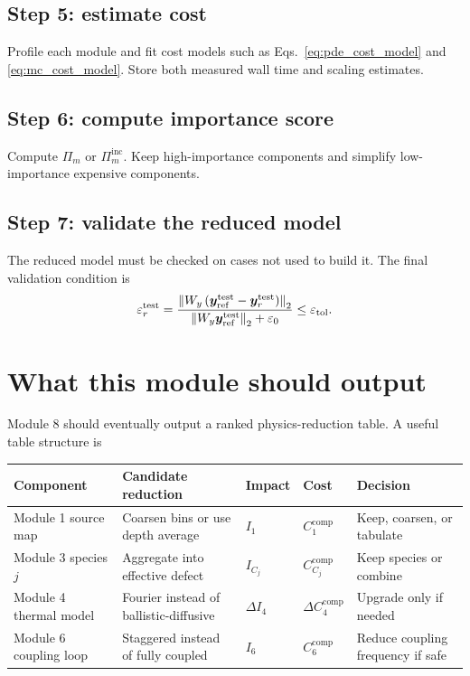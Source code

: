 \documentclass[11pt]{article}
\begin{document}
\subsection{Step 5: estimate cost}
Profile each module and fit cost models such as Eqs.~\eqref{eq:pde_cost_model} and \eqref{eq:mc_cost_model}. Store both measured wall time and scaling estimates.

\subsection{Step 6: compute importance score}
Compute \(\Pi_m\) or \(\Pi_m^{\mathrm{inc}}\). Keep high-importance components and simplify low-importance expensive components.

\subsection{Step 7: validate the reduced model}
The reduced model must be checked on cases not used to build it. The final validation condition is
\begin{equation}
    \varepsilon_r^{\mathrm{test}}
    =
    \frac{\norm{W_y\left(\bm{y}_{\mathrm{ref}}^{\mathrm{test}}-\bm{y}_{r}^{\mathrm{test}}\right)}_2}
    {\norm{W_y\bm{y}_{\mathrm{ref}}^{\mathrm{test}}}_2+\varepsilon_0}
    \leq
    \varepsilon_{\mathrm{tol}}.
    \label{eq:test_error_condition}
\end{equation}

\section{What this module should output}
Module 8 should eventually output a ranked physics-reduction table. A useful table structure is
\begin{center}
\begin{tabularx}{0.96\textwidth}{>{\RaggedRight\arraybackslash}p{}>{\RaggedRight\arraybackslash}p{}>{\RaggedRight\arraybackslash}p{}>{\RaggedRight\arraybackslash}p{}>{\RaggedRight\arraybackslash}X}
\toprule
Component & Candidate reduction & Impact & Cost & Decision \\
\midrule
Module 1 source map & Coarsen bins or use depth average & \(I_1\) & \(C_1^{\mathrm{comp}}\) & Keep, coarsen, or tabulate \\
Module 3 species \(j\) & Aggregate into effective defect & \(I_{C_j}\) & \(C_{C_j}^{\mathrm{comp}}\) & Keep species or combine \\
Module 4 thermal model & Fourier instead of ballistic-diffusive & \(\Delta I_4\) & \(\Delta C_4^{\mathrm{comp}}\) & Upgrade only if needed \\
Module 6 coupling loop & Staggered instead of fully coupled & \(I_6\) & \(C_6^{\mathrm{comp}}\) & Reduce coupling frequency if safe \\
\bottomrule
\end{tabularx}
\end{center}
\end{document}

